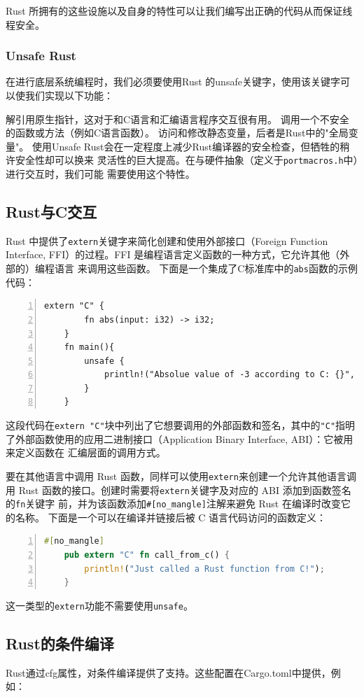 \documentclass{../runikraft-report}
\begin{document}
Rust 所拥有的这些设施以及自身的特性可以让我们编写出正确的代码从而保证线程安全。\cite{9}

\subsubsection{Unsafe Rust}
在进行底层系统编程时，我们必须要使用Rust 的unsafe关键字，使用该关键字可以使我们实现以下功能：

解引用原生指针，这对于和C语言和汇编语言程序交互很有用。
调用一个不安全的函数或方法（例如C语言函数）。
访问和修改静态变量，后者是Rust中的"全局变量"。
使用Unsafe Rust会在一定程度上减少Rust编译器的安全检查，但牺牲的稍许安全性却可以换来
灵活性的巨大提高。在与硬件抽象（定义于\texttt{portmacros.h}中）进行交互时，我们可能
需要使用这个特性。

\subsection{Rust与C交互}
Rust 中提供了\texttt{extern}关键字来简化创建和使用外部接口（Foreign Function
Interface, FFI）的过程。FFI 是编程语言定义函数的一种方式，它允许其他（外部的）编程语言
来调用这些函数。
下面是一个集成了C标准库中的\texttt{abs}函数的示例代码：
\begin{lstlisting}[numbers=left]
	extern "C" {
		fn abs(input: i32) -> i32;
	}
	fn main(){
		unsafe {
			println!("Absolue value of -3 according to C: {}", abs(-3));
		}
	}
\end{lstlisting}
这段代码在\texttt{extern "C"}块中列出了它想要调用的外部函数和签名，其中的\texttt{"C"}指明
了外部函数使用的应用二进制接口（Application Binary Interface, ABI）：它被用来定义函数在
汇编层面的调用方式。

要在其他语言中调用 Rust 函数，同样可以使用\texttt{extern}来创建一个允许其他语言调用 Rust
函数的接口。创建时需要将\texttt{extern}关键字及对应的 ABI 添加到函数签名的\texttt{fn}关键字
前，并为该函数添加\texttt{\#[no\_mangle]}注解来避免 Rust 在编译时改变它的名称。
下面是一个可以在编译并链接后被 C 语言代码访问的函数定义：
\begin{lstlisting}[numbers=left,language=Rust]
	#[no_mangle]
	pub extern "C" fn call_from_c() {
		println!("Just called a Rust function from C!");
	}
\end{lstlisting}
这一类型的\texttt{extern}功能不需要使用\texttt{unsafe}。

\subsection{Rust的条件编译}\label{subsec:cond-compile}
Rust通过cfg属性，对条件编译提供了支持。这些配置在Cargo.toml中提供，例如：
\end{document}
